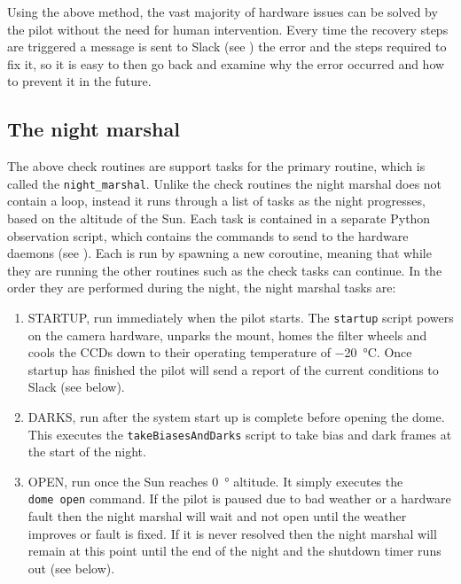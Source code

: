 \begin{colsection}
\begin{colsection}
Using the above method, the vast majority of hardware issues can be solved by the pilot without the need for human intervention. Every time the recovery steps are triggered a message is sent to Slack (see ) the error and the steps required to fix it, so it is easy to then go back and examine why the error occurred and how to prevent it in the future.

\end{colsection}

\subsection{The night marshal}
\label{sec:night_marshal}
\begin{colsection}

The above check routines are support tasks for the primary routine, which is called the \texttt{night\_marshal}. Unlike the check routines the night marshal does not contain a loop, instead it runs through a list of tasks as the night progresses, based on the altitude of the Sun. Each task is contained in a separate Python observation script, which contains the commands to send to the hardware daemons (see ). Each is run by spawning a new coroutine, meaning that while they are running the other routines such as the check tasks can continue. In the order they are performed during the night, the night marshal tasks are:

\begin{enumerate}

\item STARTUP, run immediately when the pilot starts. The \texttt{startup} script powers on the camera hardware, unparks the mount, homes the filter wheels and cools the CCDs down to their operating temperature of \SI{-20}{\celsius}. Once startup has finished the pilot will send a report of the current conditions to Slack (see  below).

\item DARKS, run after the system start up is complete before opening the dome. This executes the \texttt{takeBiasesAndDarks} script to take bias and dark frames at the start of the night.

\item OPEN, run once the Sun reaches \SI{0}{\degree} altitude. It simply executes the \texttt{dome~open} command. If the pilot is paused due to bad weather or a hardware fault then the night marshal will wait and not open until the weather improves or fault is fixed. If it is never resolved then the night marshal will remain at this point until the end of the night and the shutdown timer runs out (see below).


\end{enumerate}
\end{colsection}
\end{colsection}
